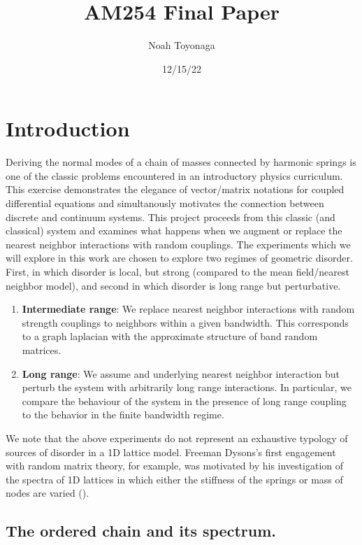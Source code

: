\documentclass{article}
\title{AM254 Final Paper}
\author{Noah Toyonaga}
\date{12/15/22}
\begin{document}
\maketitle


\section{Introduction}
Deriving the normal modes of a chain of masses connected by harmonic springs is one of the 
classic problems encountered in an introductory physics curriculum.
This exercise demonstrates the elegance of 
vector/matrix notations for coupled differential equations 
and simultanously motivates the connection between discrete and continuum systems. 
This project proceeds from this classic (and classical) system
and examines what happens when we augment or replace the nearest neighbor interactions with random couplings. 
The experiments which we will explore in this work are chosen to explore two regimes of geometric disorder. 
First, in which disorder is local, but strong (compared to the mean field/nearest neighbor model), and second in which disorder is long range but perturbative. 

\begin{enumerate}
	\item \textbf{Intermediate range}: We replace nearest neighbor interactions with random strength couplings to
		neighbors within a given bandwidth. 
		This corresponds to a graph laplacian with the approximate structure of band random matrices. 
	\item \textbf{Long range}: We assume and underlying nearest neighbor interaction but perturb the system with arbitrarily long range interactions.
		In particular, we compare the behaviour of the system in the presence of long range coupling to the behavior in the finite bandwidth regime. 
\end{enumerate}

We note that the above experiments do not represent an exhaustive typology of sources of disorder in a 1D lattice model. 
Freeman Dysons's first engagement with random matrix theory, for example,
was motivated by his investigation of the spectra 
of 1D lattices in which either the stiffness of the springs or mass of nodes are varied (\cite{Dyson1953-oa,Forrester2021-xr}). 

\subsection{The ordered chain and its spectrum.}
\end{document}
